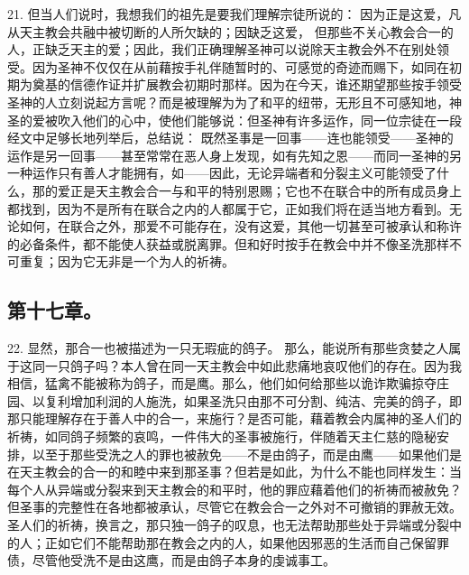 21. 但当人们说时，我想我们的祖先是要我们理解宗徒所说的： 因为正是这爱，凡从天主教会共融中被切断的人所欠缺的；因缺乏这爱， 但那些不关心教会合一的人，正缺乏天主的爱；因此，我们正确理解圣神可以说除天主教会外不在别处领受。因为圣神不仅仅在从前藉按手礼伴随暂时的、可感觉的奇迹而赐下，如同在初期为奠基的信德作证并扩展教会初期时那样。因为在今天，谁还期望那些按手领受圣神的人立刻说起方言呢？而是被理解为为了和平的纽带，无形且不可感知地，神圣的爱被吹入他们的心中，使他们能够说：但圣神有许多运作，同一位宗徒在一段经文中足够长地列举后，总结说： 既然圣事是一回事——连也能领受——圣神的运作是另一回事——甚至常常在恶人身上发现，如有先知之恩——而同一圣神的另一种运作只有善人才能拥有，如——因此，无论异端者和分裂主义可能领受了什么，那的爱正是天主教会合一与和平的特别恩赐；它也不在联合中的所有成员身上都找到，因为不是所有在联合之内的人都属于它，正如我们将在适当地方看到。无论如何，在联合之外，那爱不可能存在，没有这爱，其他一切甚至可被承认和称许的必备条件，都不能使人获益或脱离罪。但和好时按手在教会中并不像圣洗那样不可重复；因为它无非是一个为人的祈祷。\par


\subsection{第十七章。}

22.   显然，那合一也被描述为一只无瑕疵的鸽子。  那么，能说所有那些贪婪之人属于这同一只鸽子吗？本人曾在同一天主教会中如此悲痛地哀叹他们的存在。因为我相信，猛禽不能被称为鸽子，而是鹰。那么，他们如何给那些以诡诈欺骗掠夺庄园、以复利增加利润的人施洗，如果圣洗只由那不可分割、纯洁、完美的鸽子，即那只能理解存在于善人中的合一，来施行？是否可能，藉着教会内属神的圣人们的祈祷，如同鸽子频繁的哀鸣，一件伟大的圣事被施行，伴随着天主仁慈的隐秘安排，以至于那些受洗之人的罪也被赦免——不是由鸽子，而是由鹰——如果他们是在天主教会的合一的和睦中来到那圣事？但若是如此，为什么不能也同样发生：当每个人从异端或分裂来到天主教会的和平时，他的罪应藉着他们的祈祷而被赦免？但圣事的完整性在各地都被承认，尽管它在教会合一之外对不可撤销的罪赦无效。圣人们的祈祷，换言之，那只独一鸽子的叹息，也无法帮助那些处于异端或分裂中的人；正如它们不能帮助那在教会之内的人，如果他因邪恶的生活而自己保留罪债，尽管他受洗不是由这鹰，而是由鸽子本身的虔诚事工。\par

